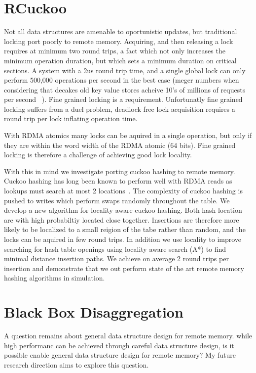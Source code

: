 \section{RCuckoo}

Not all data structures are amenable to oportunistic
updates, but traditional locking port poorly to remote
memory. Acquiring, and then releasing a lock requires at
minimum two round trips, a fact which not only increases the
minimum operation duration, but which sets a minimum
duration on critical sections. A system with a 2us round
trip time, and a single global lock can only perform 500,000
operations per second in the best case (meger numbers when
considering that decakes old key value stores acheive 10's
of millions of requests per second ~\cite{herd}). Fine
grained locking is a requirement. Unfortunatly fine grained
locking suffers from a duel problem, deadlock free lock
acquisition requires a round trip per lock inflating
operation time. 

With RDMA atomics many locks can be aquired in a single
operation, but only if they are within the word width of the
RDMA atomic (64 bits). Fine grained locking is therefore a
challenge of achieving good lock locality.

With this in mind we investigate porting cuckoo hashing to
remote memory. Cuckoo hashing has long been known to perform
well with RDMA reads as lookups must search at most 2
locations~\cite{pilaf, farm}. The complexity of cuckoo
hashing is pushed to writes which perform swaps randomly
throughout the table. We develop a new algorithm for
locality aware cuckoo hashing. Both hash location are with
high probabiltiy located close together. Insertions are
therefore more likely to be localized to a small reigion of
the tabe rather than random, and the locks can be aquired in
few round trips. In addition we use locality to improve
searching for hash table openings using locality aware
search (A*) to find minimal distance insertion paths. We
achieve on average 2 round trips per insertion and
demonstrate that we out perform state of the art remote
memory hashing algorithms in simulation.



\section{Black Box Disaggregation}

A question remains about general data structure design for
remote memory. while high performanc can be achieved through
careful data structure design, is it possible enable general
data structure design for remote memory? My future research
direction aims to explore this question.

